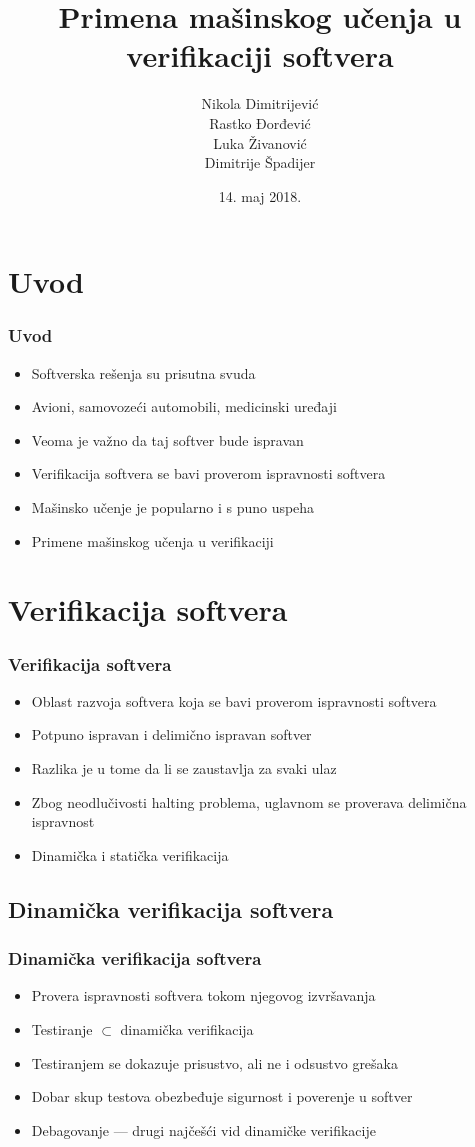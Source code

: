 \documentclass[11pt]{beamer}
\title{Primena mašinskog učenja u verifikaciji softvera}
\author[\hspace{-0.8em}N. Dimitrijević, R. Đorđević, L. Živanović, D. Špadijer]
		{Nikola Dimitrijević\\ %
        Rastko Đorđević\\ %
        Luka Živanović\\ %
        Dimitrije Špadijer} %
\date{14. maj 2018.}
\theoremstyle{definition}
\begin{document}
\begin{frame}
\titlepage
\end{frame}

\section{Uvod}
\label{sec:uvod}
\begin{frame}
\frametitle{Uvod}
\begin{itemize}
\item Softverska rešenja su prisutna svuda
\item Avioni, samovozeći automobili, medicinski uređaji
\item Veoma je važno da taj softver bude ispravan
\item Verifikacija softvera se bavi proverom ispravnosti softvera
\item Mašinsko učenje je popularno i s puno uspeha
\item Primene mašinskog učenja u verifikaciji
\end{itemize}

\end{frame}
\section{Verifikacija softvera}
\label{sec:verifikacija}
\begin{frame}
\frametitle{Verifikacija softvera}
\begin{itemize}
\item Oblast razvoja softvera koja se bavi proverom ispravnosti softvera
\item Potpuno ispravan i delimično ispravan softver
\item Razlika je u tome da li se zaustavlja za svaki ulaz
\item Zbog neodlučivosti halting problema, uglavnom se proverava delimična ispravnost
\item Dinamička i statička verifikacija \cite{milena}
\end{itemize}
\end{frame}

\subsection{Dinamička verifikacija softvera}
\label{subsec:dinamicka}
\begin{frame}
\frametitle{Dinamička verifikacija softvera}
\begin{itemize}
\item Provera ispravnosti softvera tokom njegovog izvršavanja
\item Testiranje $\subset$ dinamička verifikacija
\item Testiranjem se dokazuje prisustvo, ali ne i odsustvo grešaka
\item Dobar skup testova obezbeđuje sigurnost i poverenje u softver
\item Debagovanje --- drugi najčešći vid dinamičke verifikacije
\end{itemize}
\end{frame}
\end{document}
